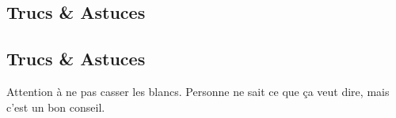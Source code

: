    \vspace{1cm}
    \hline
    \vspace{1cm}
    
    \subsection{Trucs \& Astuces}
        \subsection{Trucs \& Astuces}
	Attention à ne pas casser les blancs. Personne ne sait ce que ça veut dire, mais c'est un bon conseil.
